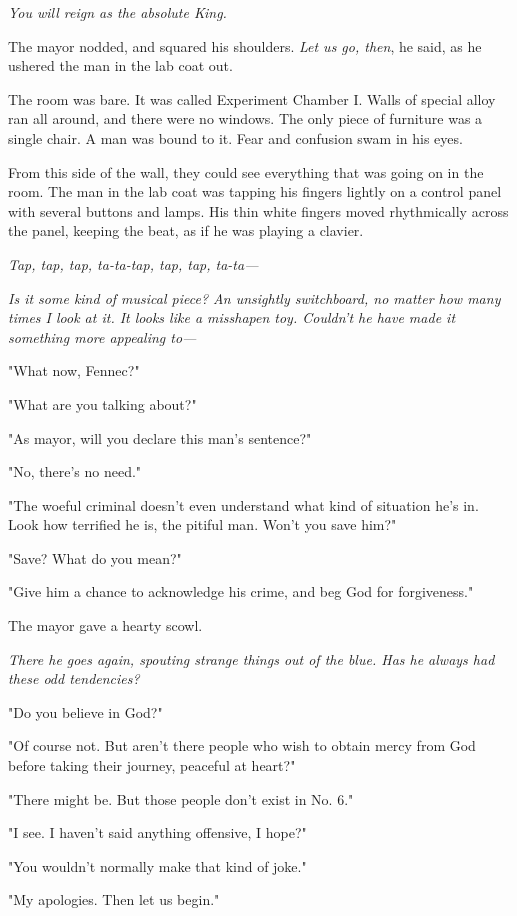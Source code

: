 \emph{You will reign as the absolute King.}

The mayor nodded, and squared his shoulders. \emph{Let us go, then}, he said,
as he ushered the man in the lab coat out.

The room was bare. It was called Experiment Chamber I. Walls of special
alloy ran all around, and there were no windows. The only piece of
furniture was a single chair. A man was bound to it. Fear and confusion
swam in his eyes.

From this side of the wall, they could see everything that was going on
in the room. The man in the lab coat was tapping his fingers lightly on
a control panel with several buttons and lamps. His thin white fingers
moved rhythmically across the panel, keeping the beat, as if he was
playing a clavier.

\emph{Tap, tap, tap, ta-ta-tap, tap, tap, ta-ta---}

\emph{Is it some kind of musical piece? An unsightly switchboard, no matter
how many times I look at it. It looks like a misshapen toy. Couldn't he
have made it something more appealing to---}

"What now, Fennec?"

"What are you talking about?"

"As mayor, will you declare this man's sentence?"

"No, there's no need."

"The woeful criminal doesn't even understand what kind of situation he's
in. Look how terrified he is, the pitiful man. Won't you save him?"

"Save? What do you mean?"

"Give him a chance to acknowledge his crime, and beg God for
forgiveness."

The mayor gave a hearty scowl.

\emph{There he goes again, spouting strange things out of the blue. Has he
always had these odd tendencies?}

"Do you believe in God?"

"Of course not. But aren't there people who wish to obtain mercy from
God before taking their journey, peaceful at heart?"

"There might be. But those people don't exist in No. 6."

"I see. I haven't said anything offensive, I hope?"

"You wouldn't normally make that kind of joke."

"My apologies. Then let us begin."

